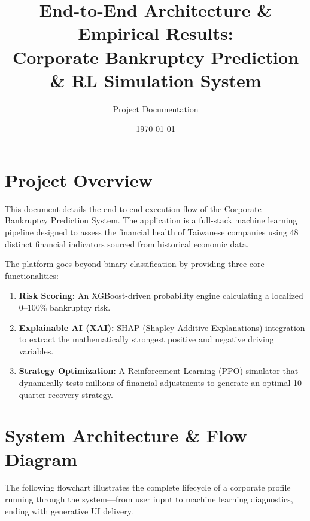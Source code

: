 \documentclass[11pt, a4paper]{article}
\title{\textbf{End-to-End Architecture \& Empirical Results:\\Corporate Bankruptcy Prediction \& RL Simulation System}}
\author{Project Documentation}
\date{\today}
\begin{document}
\maketitle

\section{Project Overview}
This document details the end-to-end execution flow of the Corporate Bankruptcy Prediction System. The application is a full-stack machine learning pipeline designed to assess the financial health of Taiwanese companies using 48 distinct financial indicators sourced from historical economic data.

The platform goes beyond binary classification by providing three core functionalities:
\begin{enumerate}[label=\textbf{\arabic*.}]
    \item \textbf{Risk Scoring:} An XGBoost-driven probability engine calculating a localized 0--100\% bankruptcy risk.
    \item \textbf{Explainable AI (XAI):} SHAP (Shapley Additive Explanations) integration to extract the mathematically strongest positive and negative driving variables.
    \item \textbf{Strategy Optimization:} A Reinforcement Learning (PPO) simulator that dynamically tests millions of financial adjustments to generate an optimal 10-quarter recovery strategy.
\end{enumerate}

\section{System Architecture \& Flow Diagram}

The following flowchart illustrates the complete lifecycle of a corporate profile running through the system—from user input to machine learning diagnostics, ending with generative UI delivery.

\vspace{1em}
\end{document}

